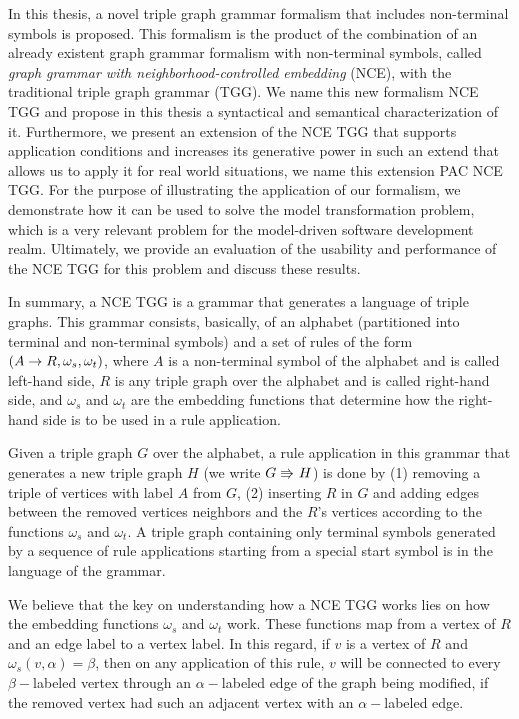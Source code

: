 In this thesis, a novel triple graph grammar formalism that includes non-terminal symbols is proposed. This formalism is the product of the combination of an already existent graph grammar formalism with non-terminal symbols, called \emph{graph grammar with neighborhood-controlled embedding} (NCE), with the traditional triple graph grammar (TGG). We name this new formalism NCE TGG and propose in this thesis a syntactical and semantical characterization of it. Furthermore, we present an extension of the NCE TGG that supports application conditions and increases its generative power in such an extend that allows us to apply it for real world situations, we name this extension PAC NCE TGG. For the purpose of illustrating the application of our formalism, we demonstrate how it can be used to solve the model transformation problem, which is a very relevant problem for the model-driven software development realm. Ultimately, we provide an evaluation of the usability and performance of the NCE TGG for this problem and discuss these results.

In summary, a NCE TGG is a grammar that generates a language of triple graphs. This grammar consists, basically, of an alphabet (partitioned into terminal and non-terminal symbols) and a set of rules of the form $(A \to R,\omega_s,\omega_t)$, where $A$ is a non-terminal symbol of the alphabet and is called left-hand side, $R$ is any triple graph over the alphabet and is called right-hand side, and $\omega_s$ and $\omega_t$ are the embedding functions that determine how the right-hand side is to be used in a rule application.

Given a triple graph $G$ over the alphabet, a rule application in this grammar that generates a new triple graph $H$ (we write $G \tcderiv{}{}{} H$) is done by (1) removing a triple of vertices with label $A$ from $G$, (2) inserting $R$ in $G$ and adding edges between the removed vertices neighbors and the $R$'s vertices according to the functions $\omega_s$ and $\omega_t$. A triple graph containing only terminal symbols generated by a sequence of rule applications starting from a special start symbol is in the language of the grammar.

We believe that the key on understanding how a NCE TGG works lies on how the embedding functions $\omega_s$ and $\omega_t$ work. These functions map from a vertex of $R$ and an edge label to a vertex label. In this regard, if $v$ is a vertex of $R$ and $\omega_s(v,\alpha) = \beta$, then on any application of this rule, $v$ will be connected to every $\beta-$labeled vertex through an $\alpha-$labeled edge of the graph being modified, if the removed vertex had such an adjacent vertex with an $\alpha-$labeled edge.

